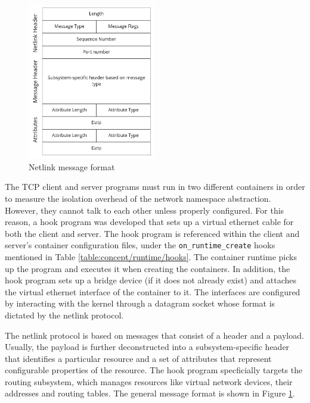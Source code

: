 \begin{figure}[H]
    \centering
    \includegraphics[width=0.5\textwidth]{images/implementation/netlink-message.jpg}
    \caption{Netlink message format}
    \label{images:implementation/netlink-message.jpg}
\end{figure}

The TCP client and server programs must run in two different containers in order to measure 
the isolation overhead of the network namespace abstraction. However, they cannot talk to each other 
unless properly configured. For this reason, a hook program was developed that sets up a virtual 
ethernet cable for both the client and server. The hook program is referenced within the 
client and server's container configuration files, under the \verb|on_runtime_create| hooks mentioned in Table \ref{table:concept/runtime/hooks}. 
The container runtime picks up the program and executes it when creating the containers.
In addition, the hook program sets up a bridge device (if it does not already exist) and attaches 
the virtual ethernet interface of the container to it. 
The interfaces are configured by interacting with the kernel through a datagram socket whose format 
is dictated by the netlink protocol.

The netlink protocol is based on messages that consist of a header and a payload.
Usually, the payload is further deconstructed into a subsystem-specific header that identifies 
a particular resource and a set of attributes that represent configurable properties of the resource.
The hook program specficially targets the routing subsystem, which manages resources like 
virtual network devices, their addresses and routing tables. The general message format 
is shown in Figure \ref{images:implementation/netlink-message.jpg}.

